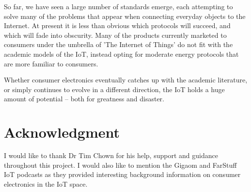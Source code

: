 \documentclass[10pt,journal,compsoc]{IEEEtran}
\begin{document}
So far, we have seen a large number of standards emerge, each attempting to
solve many of the problems that appear when connecting everyday objects to the
Internet. At present it is less than obvious which protocols will succeed, and
which will fade into obscurity. Many of the products currently marketed to
consumers under the umbrella of 'The Internet of Things' do not fit with the
academic models of the IoT, instead opting for moderate energy protocols that
are more familiar to consumers. 

Whether consumer electronics eventually catches up with the academic
literature, or simply continues to evolve in a different direction, the IoT
holds a huge amount of potential -- both for greatness and disaster.  


\section*{Acknowledgment}
I would like to thank Dr Tim Chown for his help, support and guidance
throughout this project. I would also like to mention the Gigaom and FarStuff
IoT podcasts as they provided interesting background information on consumer
electronics in the IoT space. 


\end{document}
